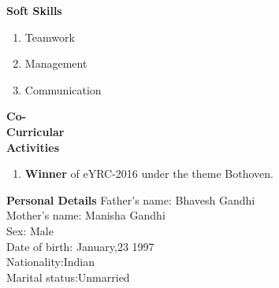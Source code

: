 \documentclass{article}
\begin{document}
	   \begin{flushleft} 
	     	 		
	     	 		\vspace{0.4in}
	     	 		\textbf{Soft Skills}
	     	 		\begin{enumerate}
	     	 			\vspace{-0.30in}
	     	 			\addtolength{\itemindent}{1.359in}
						\item Teamwork 
						\item Management	     	 			
	     	 			\item Communication  
	     	 			
	     	 		\end{enumerate}
	     	 	\end{flushleft}
	     	 	
	     
	   \begin{flushleft} 
	      	\vspace{0.4in}
	      	\textbf{Co- \\Curricular \\Activities }
	      	\begin{enumerate}
	      		\vspace{-0.65in}
	      		\addtolength{\itemindent}{1.359in}
	      		\item  \textbf{Winner} of eYRC-2016 under the theme Bothoven. 
	      	\end{enumerate}
	      \end{flushleft}
	      
	    \begin{flushleft}
	      	\vspace{0.4in}
	      	\textbf{Personal Details} \hspace{0.36in}Father's name: \hspace{0.13in} Bhavesh Gandhi \\
	      	\hspace{1.55in}Mother's name: \hspace{0.08in} Manisha Gandhi\\
	      	\hspace{1.55in}Sex:\hspace{0.85in} Male\\
	      	\hspace{1.55in}Date of birth:\hspace{0.255in} January,23 1997	\\
	      	\hspace{1.55in}Nationality:\hspace{0.45in}Indian\\
	      	\hspace{1.55in}Marital status:\hspace{0.28in}Unmarried
	      	
	      \end{flushleft}
	      
\end{document}
